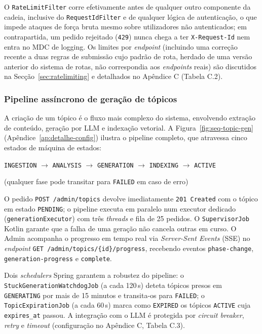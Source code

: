 O \texttt{RateLimitFilter} corre efetivamente antes de qualquer outro componente da cadeia, inclusive do \texttt{RequestIdFilter} e de qualquer lógica de autenticação, o que impede ataques de força bruta mesmo sobre utilizadores não autenticados; em contrapartida, um pedido rejeitado (\texttt{429}) nunca chega a ter \texttt{X-Request-Id} nem entra no MDC de logging.
Os limites por \textit{endpoint} (incluindo uma correção recente a duas regras de submissão cujo padrão de rota, herdado de uma versão anterior do sistema de rotas, não correspondia aos \textit{endpoints} reais) são discutidos na Secção~\ref{sec:ratelimiting} e detalhados no Apêndice C (Tabela C.2).

\subsubsection*{Pipeline assíncrono de geração de tópicos}

A criação de um tópico é o fluxo mais complexo do sistema, envolvendo extração de conteúdo, geração por LLM e indexação vetorial.
A Figura~\ref{fig:seq-topic-gen} (Apêndice~\ref{ap:detalhe-config}) ilustra o pipeline completo, que atravessa cinco estados de máquina de estados:

\begin{center}
\texttt{INGESTION} $\rightarrow$ \texttt{ANALYSIS} $\rightarrow$ \texttt{GENERATION} $\rightarrow$ \texttt{INDEXING} $\rightarrow$ \texttt{ACTIVE}
\end{center}
\begin{center}
(qualquer fase pode transitar para \texttt{FAILED} em caso de erro)
\end{center}

O pedido \texttt{POST /admin/topics} devolve imediatamente \texttt{201 Created} com o tópico em estado \texttt{PENDING}; o pipeline executa em paralelo num executor dedicado (\texttt{generationExecutor}) com três \textit{threads} e fila de 25 pedidos.
O \texttt{SupervisorJob} Kotlin garante que a falha de uma geração não cancela outras em curso.
O Admin acompanha o progresso em tempo real via \textit{Server-Sent Events} (SSE) no \textit{endpoint} \texttt{GET /admin/topics/\{id\}/progress}, recebendo eventos \texttt{phase-change}, \texttt{generation-progress} e \texttt{complete}.

Dois \textit{schedulers} Spring garantem a robustez do pipeline: o \texttt{StuckGenerationWatchdogJob} (a cada 120\,s) deteta tópicos presos em \texttt{GENERATING} por mais de 15 minutos e transita-os para \texttt{FAILED}; o \texttt{TopicExpirationJob} (a cada 60\,s) marca como \texttt{EXPIRED} os tópicos \texttt{ACTIVE} cuja \texttt{expires\_at} passou. A integração com o LLM é protegida por \textit{circuit breaker}, \textit{retry} e \textit{timeout} (configuração no Apêndice C, Tabela C.3).

